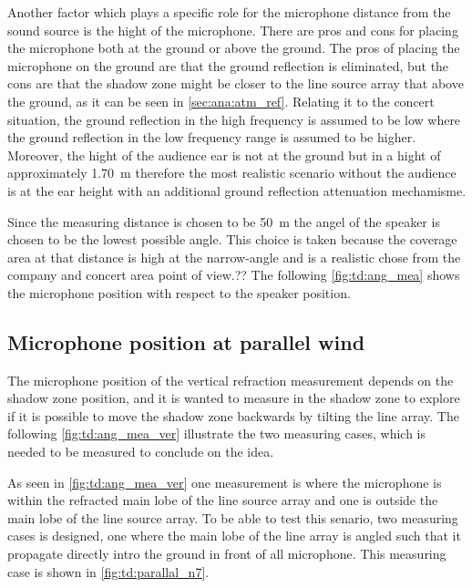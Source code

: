 Another factor which plays a specific role for the microphone distance from the sound source is the hight of the microphone. There are pros and cons for placing the microphone both at the ground or above the ground. The pros of placing the microphone on the ground are that the ground reflection is eliminated, but the cons are that the shadow zone might be closer to the line source array that above the ground, as it can be seen in \autoref{sec:ana:atm_ref}. Relating it to the concert situation, the ground reflection in the high frequency is assumed to be low where the ground reflection in the low frequency range is assumed to be higher. Moreover, the hight of the audience ear is not at the ground but in a hight of approximately \SI{1.70}{\meter} therefore the most realistic scenario without the audience is at the ear height with an additional ground reflection attenuation mechamisme.


Since the measuring distance is chosen to be \SI{50}{\meter} the angel of the speaker is chosen to be the lowest possible angle. This choice is taken because the coverage area at that distance is high at the narrow-angle and is a realistic chose from the company and concert area point of view.?? The following \autoref{fig:td:ang_mea} shows the microphone position with respect to the speaker position. 



\subsection{Microphone position at parallel wind}
The microphone position of the vertical refraction measurement depends on the shadow zone position, and it is wanted to measure in the shadow zone to explore if it is possible to move the shadow zone backwards by tilting the line array. The following \autoref{fig:td:ang_mea_ver} illustrate the two measuring cases, which is needed to be measured to conclude on the idea. 


As seen in \autoref{fig:td:ang_mea_ver} one measurement is where the microphone is within the refracted main lobe of the line source array and one is outside the main lobe of the line source array. To be able to test this senario, two measuring cases is designed, one where the main lobe of the line array is angled such that it propagate directly intro the ground in front of all microphone. This measuring case is shown in \autoref{fig:td:parallal_n7}. 

